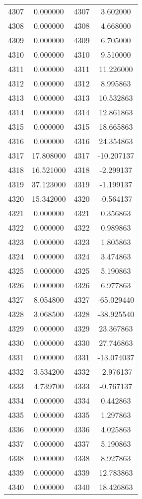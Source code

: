 \documentclass[12pt]{article}
\begin{document}
\begin{longtable}{@{}cccc@{}}
4307 & 0.000000 & 4307 & 3.602000 \\
4308 & 0.000000 & 4308 & 4.668000 \\
4309 & 0.000000 & 4309 & 6.705000 \\
4310 & 0.000000 & 4310 & 9.510000 \\
4311 & 0.000000 & 4311 & 11.226000 \\
4312 & 0.000000 & 4312 & 8.995863 \\
4313 & 0.000000 & 4313 & 10.532863 \\
4314 & 0.000000 & 4314 & 12.861863 \\
4315 & 0.000000 & 4315 & 18.665863 \\
4316 & 0.000000 & 4316 & 24.354863 \\
4317 & 17.808000 & 4317 & -10.207137 \\
4318 & 16.521000 & 4318 & -2.299137 \\
4319 & 37.123000 & 4319 & -1.199137 \\
4320 & 15.342000 & 4320 & -0.564137 \\
4321 & 0.000000 & 4321 & 0.356863 \\
4322 & 0.000000 & 4322 & 0.989863 \\
4323 & 0.000000 & 4323 & 1.805863 \\
4324 & 0.000000 & 4324 & 3.474863 \\
4325 & 0.000000 & 4325 & 5.190863 \\
4326 & 0.000000 & 4326 & 6.977863 \\
4327 & 8.054800 & 4327 & -65.029440 \\
4328 & 3.068500 & 4328 & -38.925540 \\
4329 & 0.000000 & 4329 & 23.367863 \\
4330 & 0.000000 & 4330 & 27.746863 \\
4331 & 0.000000 & 4331 & -13.074037 \\
4332 & 3.534200 & 4332 & -2.976137 \\
4333 & 4.739700 & 4333 & -0.767137 \\
4334 & 0.000000 & 4334 & 0.442863 \\
4335 & 0.000000 & 4335 & 1.297863 \\
4336 & 0.000000 & 4336 & 4.025863 \\
4337 & 0.000000 & 4337 & 5.190863 \\
4338 & 0.000000 & 4338 & 8.927863 \\
4339 & 0.000000 & 4339 & 12.783863 \\
4340 & 0.000000 & 4340 & 18.426863 \\

\end{longtable}
\end{document}
